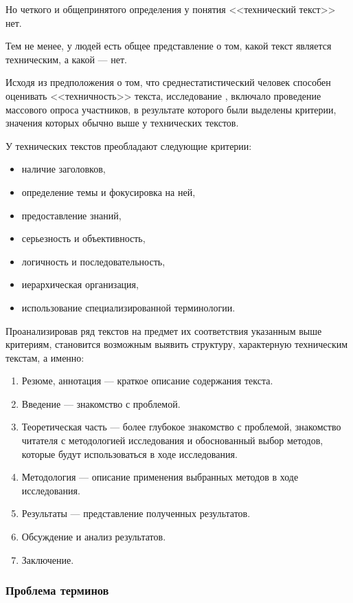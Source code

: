 Но четкого и общепринятого определения у понятия <<технический текст>> нет.

Тем не менее, у людей есть общее представление о том, какой текст является техническим, а какой --- нет.

Исходя из предположения о том, что среднестатистический человек способен оценивать <<техничность>> текста, исследование \cite{tt}, включало проведение массового опроса участников, в результате которого были выделены критерии, значения которых обычно выше у технических текстов.

У технических текстов преобладают следующие критерии:
\begin{itemize}
    \item наличие заголовков,
    \item определение темы и фокусировка на ней,
    \item предоставление знаний,
    \item серьезность и объективность,
    \item логичность и последовательность,
    \item иерархическая организация,
    \item использование специализированной терминологии.
\end{itemize}

Проанализировав ряд текстов на предмет их соответствия указанным выше критериям, становится возможным выявить структуру, характерную техническим текстам, а именно:
\begin{enumerate}
    \item Резюме, аннотация --- краткое описание содержания текста.
    \item Введение --- знакомство с проблемой.
    \item Теоретическая часть --- более глубокое знакомство с проблемой, знакомство читателя с методологией исследования и обоснованный выбор методов, которые будут использоваться в ходе исследования.
    \item Методология --- описание применения выбранных методов в ходе исследования.
    \item Результаты --- представление полученных результатов.
    \item Обсуждение и анализ результатов.
    \item Заключение.
\end{enumerate}






\subsubsection{Проблема терминов}

